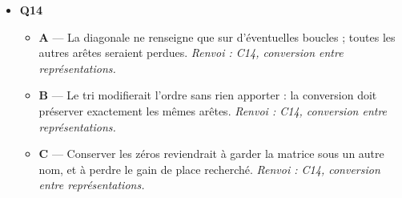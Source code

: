 \begin{itemize}
\begin{itemize}
    \item \textbf{B} — Il faut de toute façon une entrée par sommet, y compris pour un sommet isolé sans aucune arête. \emph{Renvoi : C13, listes de successeurs.}
    \item \textbf{D} — Aucune structure ne duplique les arêtes pour chaque sommet ; chaque arête n'est enregistrée qu'une ou deux fois. \emph{Renvoi : C13, listes de successeurs.}
  \end{itemize}
  \item \textbf{Q14}
  \begin{itemize}
    \item \textbf{A} — La diagonale ne renseigne que sur d'éventuelles boucles ; toutes les autres arêtes seraient perdues. \emph{Renvoi : C14, conversion entre représentations.}
    \item \textbf{B} — Le tri modifierait l'ordre sans rien apporter : la conversion doit préserver exactement les mêmes arêtes. \emph{Renvoi : C14, conversion entre représentations.}
    \item \textbf{C} — Conserver les zéros reviendrait à garder la matrice sous un autre nom, et à perdre le gain de place recherché. \emph{Renvoi : C14, conversion entre représentations.}
  \end{itemize}
\end{itemize}
\fi
